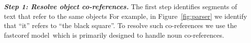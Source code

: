 



\vspace{0.5em}
\noindent
{\bf \em Step 1: Resolve object co-references.}
The first step
identifies segments of text that refer to the same objects
For example, in Figure~\ref{fig:parser} we identify that ``it'' refers to
``the black square''.
%
To resolve such co-references %
we use the fastcoref model\,\cite{otmazgin2022fastcoref} which is primarily
designed to handle noun co-references.
%


%


